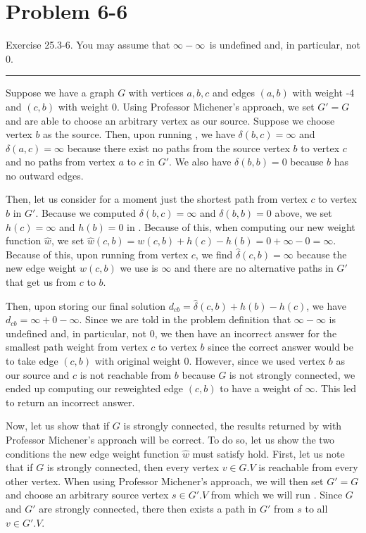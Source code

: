 \documentclass[11pt]{article}
\def\separateline{\medskip\hrule\medskip}
\begin{document}
\newpage


\section{Problem 6-6}
Exercise 25.3-6. You may assume that $\infty - \infty ~$ is undefined and, in particular, not 0.
\separateline

Suppose we have a graph $G$ with vertices $a,b,c$ and edges $(a,b)$ with weight -4 and $(c,b)$ with weight 0. Using Professor Michener's approach, we set $G' = G$ and are able to choose an arbitrary vertex as our source. Suppose we choose vertex $b$ as the source. Then, upon running , we have $\delta{(b,c)} = \infty$ and $\delta{(a,c)} = \infty$ because there exist no paths from the source vertex $b$ to vertex $c$ and no paths from vertex $a$ to $c$ in $G'$. We also have $\delta{(b,b)} = 0$ because $b$ has no outward edges.

Then, let us consider for a moment just the shortest path from vertex $c$ to vertex $b$ in $G'$. Because we computed $\delta{(b,c)} = \infty$ and $\delta{(b,b)} = 0$ above, we set $h(c) = \infty$ and $h(b) = 0$ in . Because of this, when computing our new weight function $\hat{w}$, we set $\hat{w}(c,b) = w(c,b) + h(c) - h(b) = 0 + \infty - 0 = \infty$. Because of this, upon running  from vertex $c$, we find $\hat{\delta}(c,b) = \infty$ because the new edge weight $\hat{w}(c,b)$ we use is $\infty$ and there are no alternative paths in $G'$ that get us from $c$ to $b$.

Then, upon storing our final solution $d_{cb} = \hat{\delta}(c,b)+ h(b) - h(c)$, we have $d_{cb} = \infty + 0 - \infty$. Since we are told in the problem definition that $\infty - \infty$ is undefined and, in particular, not 0, we then have an incorrect answer for the smallest path weight from vertex $c$ to vertex $b$ since the correct answer would be to take edge $(c,b)$ with original weight 0. However, since we used vertex $b$ as our source and $c$ is not reachable from $b$ because $G$ is not strongly connected, we ended up computing our reweighted edge $(c,b)$ to have a weight of $\infty$. This led  to return an incorrect answer.

Now, let us show that if $G$ is strongly connected, the results returned by  with Professor Michener's approach will be correct. To do so, let us show the two conditions the new edge weight function $\hat{w}$ must satisfy hold. First, let us note that if $G$ is strongly connected, then every vertex $v \in G.V$ is reachable from every other vertex. When using Professor Michener's approach, we will then set $G' = G$ and choose an arbitrary source vertex $s \in G'.V$ from which we will run . Since $G$ and $G'$ are strongly connected, there then exists a path in $G'$ from $s$ to all $v \in G'.V$.
\end{document}
